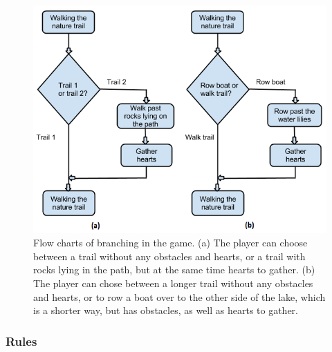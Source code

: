 \begin{figure} [H]
\centering
\includegraphics[scale=0.78]{flowchart}
\caption[Flow chart of branching]{Flow charts of branching in the game. (a) The player can choose between a trail without any obstacles and hearts, or a trail with rocks lying in the path, but at the same time hearts to gather. (b) The player can chose between a longer trail without any obstacles and hearts, or to row a boat over to the other side of the lake, which is a shorter way, but has obstacles, as well as hearts to gather.}
\label{fig:flowchart}
\end{figure} 

\subsubsection{Rules} 
 
